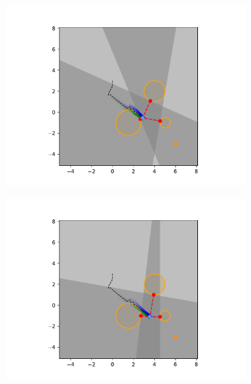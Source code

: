 \begin{figure}[h]
    \begin{subfigure}{0.20\textwidth}
        \centering
        \includegraphics[width=\textwidth]{figures/Simulations/sim1circles/frame_5.pdf}
    \end{subfigure}%
    \hfill
    \begin{subfigure}{0.20\textwidth}
        \centering
        \includegraphics[width=\textwidth]{figures/Simulations/sim1circles/frame_6.pdf}
    \end{subfigure}%
    \hfill
    \begin{subfigure}{0.20\textwidth}
        \centering

\end{subfigure}
\end{figure}
